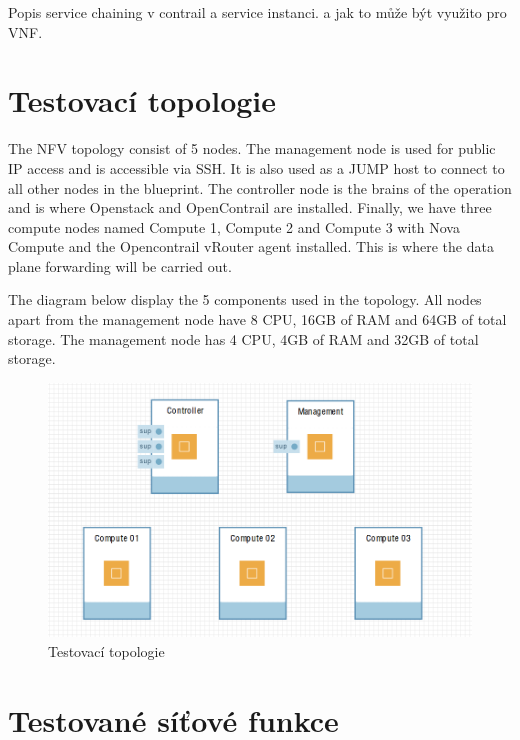 Popis service chaining v contrail a service instanci.
a jak to může být využito pro VNF.


\section{Testovací topologie}\label{sub:interaction}

The NFV topology consist of 5 nodes. The management node is used for public IP access and is accessible via SSH. It is also used as a JUMP host to connect to all other nodes in the blueprint. The controller node is the brains of the operation and is where Openstack and OpenContrail are installed. Finally, we have three compute nodes named Compute 1, Compute 2 and Compute 3 with Nova Compute and the Opencontrail vRouter agent installed. This is where the data plane forwarding will be carried out.

The diagram below display the 5 components used in the topology. All nodes apart from the management node have 8 CPU, 16GB of RAM and 64GB of total storage. The management node has 4 CPU, 4GB of RAM and 32GB of total storage.

\begin{figure}[h]
\begin{centering}
\includegraphics[scale=0.41]{images/ravello_topologie}
\par\end{centering}
\caption{Testovací topologie\label{fig:ravello_topologie}}
\end{figure}


\section{Testované síťové funkce}\label{sub:interaction}

